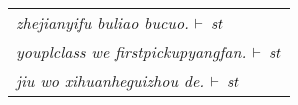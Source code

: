 \documentclass[leqno]{article}
\begin{document}
\begin{tabular}{l}
 \emph{zhejianyifu buliao bucuo.} $ \vdash \ st\rule[-.2ex]{0pt}{.9em}$ \\ 
 \emph{youplclass we firstpickupyangfan.} $ \vdash \ st\rule[-.2ex]{0pt}{.9em}$ \\ 
 \emph{jiu wo xihuanheguizhou de.} $ \vdash \ st\rule[-.2ex]{0pt}{.9em}$ \\ 
\end{tabular}
\end{document}
